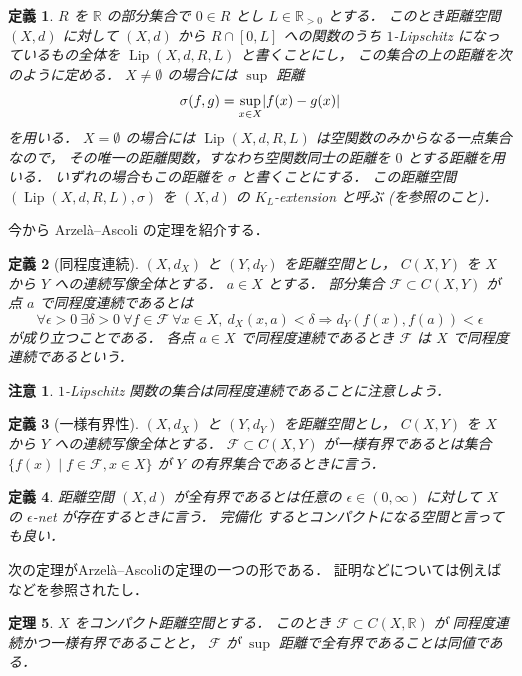 \documentclass[leqno, 12pt]{jsarticle}
\newtheorem{thm}{定理}[section]
\newtheorem{df}[thm]{定義}
\newtheorem*{rmk}{注意}
\newcommand{\To}{\Longrightarrow}
\newcommand{\rr}{\mathbb{R}}
\DeclareMathOperator{\lip}{Lip}
\DeclarePairedDelimiter{\abs}{\lvert}{\rvert}
\newcommand{\LipSpace}[4]{\lip(#1,#2,#3,#4)}
\newcommand{\LipDist}{\sigma}
\newcommand{\pospart}[1]{#1_{>0}}
\newcommand{\rrpos}{\pospart{\rr}}
\begin{document}
\begin{df}\label{df:func:Lip}
$R$
を
$\rr$
の部分集合で
$0\in R$
とし
$L\in \rrpos$
とする．
このとき距離空間
$(X, d)$
に対して
$(X, d)$
から
$R\cap [0, L]$
への関数のうち
$1$-Lipschitz
になっているもの全体を
$\LipSpace{X}{d}{R}{L}$
と書くことにし，
この集合の上の距離を次のように定める．
$X\neq\emptyset$
の場合には
$\sup$
距離
\[
\LipDist(f,g)
=
\sup_{x\in X}\abs{f(x)-g(x)}
\]
を用いる．
$X=\emptyset$
の場合には
$\LipSpace{X}{d}{R}{L}$
は空関数のみからなる一点集合なので，
その唯一の距離関数，すなわち空関数同士の距離を
$0$
とする距離を用いる．
いずれの場合もこの距離を
$\LipDist$
と書くことにする．
この距離空間
$(\LipSpace{X}{d}{R}{L}, \LipDist)$
を
$(X, d)$
の
$K_{L}$-extension
と呼ぶ
(\cite{Greenbook}を参照のこと)．
\end{df}


今から
Arzel\`{a}--Ascoli
の定理を紹介する．
\begin{df}[同程度連続]\label{df:func:equicontinuity}
$(X,d_X)$
と
$(Y,d_Y)$
を距離空間とし，
$C(X,Y)$
を
$X$
から
$Y$
への連続写像全体とする．
$a\in X$
とする．
部分集合
$\mathcal{F}\subset C(X,Y)$
が点
$a$
で同程度連続であるとは
\[
\forall \epsilon>0\ \exists \delta>0\ \forall f\in \mathcal{F}\ \forall x\in X,\ 
d_{X}(x, a)<\delta\To d_{Y}(f(x),f(a))<\epsilon
\]
が成り立つことである．
各点
$a\in X$
で同程度連続であるとき
$\mathcal{F}$
は
$X$
で同程度連続であるという．
\end{df}

\begin{rmk}\label{rmk:gromov:equicontinuity}
$1$-Lipschitz
関数の集合は同程度連続であることに注意しよう．
\end{rmk}


\begin{df}[一様有界性]\label{df:func:uniform-boundedness}
$(X,d_X)$
と
$(Y,d_Y)$
を距離空間とし，
$C(X,Y)$
を
$X$
から
$Y$
への連続写像全体とする．
$\mathcal{F}\subset C(X,Y)$
が一様有界であるとは集合
$\{f(x)\mid f\in \mathcal{F}, x\in X\}$
が
$Y$
の有界集合であるときに言う．
\end{df}

\begin{df}\label{df:func:total-boundedness}
距離空間
$(X, d)$
が全有界であるとは任意の
$\epsilon\in (0, \infty)$
に対して
$X$%
の
$\epsilon$-net
が存在するときに言う．
完備化
するとコンパクトになる空間と言っても良い．
\end{df}

次の定理がArzel\`{a}--Ascoliの定理の一つの形である．%
証明などについては例えば
\cite{denpaAA}
などを参照されたし．
\begin{thm}\label{thm:func:aa}
$X$
をコンパクト距離空間とする．
このとき
$\mathcal{F}\subset C(X, \rr)$
が
同程度連続かつ一様有界であることと，
$\mathcal{F}$
が
$\sup$
距離で全有界であることは同値である．
\end{thm}
\end{document}
